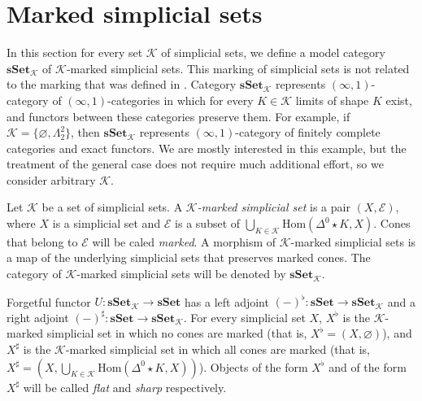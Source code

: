 \documentclass[reqno]{amsart}
\theoremstyle{definition}
\theoremstyle{remark}
\newcommand{\cat}[1]{\mathbf{#1}}
\newcommand{\sSet}{\cat{sSet}}
\newcommand{\lc}{lc}
\newcommand{\lcc}{lcc}
\newcommand{\mlc}{\mathrm{\lc}}
\newcommand{\mlcc}{\mathrm{\lcc}}
\newcommand{\K}{$\mathcal{K}$}
\newcommand{\csSet}{\sSet_\mathcal{K}}
\newcommand{\lcsSet}{\sSet^\mlc}
\newcommand{\lccsSet}{\sSet^\mlcc}
\newcommand{\join}{\star}
\newcommand{\Hom}{\mathrm{Hom}}
\numberwithin{figure}{section}
\begin{document}
\section{Marked simplicial sets}

In this section for every set $\mathcal{K}$ of simplicial sets, we define a model category $\csSet$ of \K-marked simplicial sets.
This marking of simplicial sets is not related to the marking that was defined in \cite{lurie-topos}.
Category $\csSet$ represents $(\infty,1)$-category of $(\infty,1)$-categories in which for every $K \in \mathcal{K}$ limits of shape $K$ exist, and functors between these categories preserve them.
For example, if $\mathcal{K} = \{ \varnothing, \Lambda^2_2 \}$, then $\csSet$ represents $(\infty,1)$-category of finitely complete categories and exact functors.
We are mostly interested in this example, but the treatment of the general case does not require much additional effort, so we consider arbitrary $\mathcal{K}$.

\begin{comment}
In this section we define model categories $\lcsSet$ and $\lccsSet$ of \lc- and \lcc-marked simplicial sets.
These model categories represent $(\infty,1)$-categories of locally caretesian (that is, finitely complete) and locally cartesian closed $(\infty,1)$-categories respectively.
Objects of $\lcsSet$ and $\lccsSet$ are simplicial sets in which certain simplices are marked.
To distinguish these marking from each other and from marking defined in \cite{lurie-topos}, we call such simplicial sets \lc-marked and \lcc-marked.
\end{comment}

\begin{defn}
Let $\mathcal{K}$ be a set of simplicial sets.
A \emph{\K-marked simplicial set} is a pair $(X,\mathcal{E})$, where $X$ is a simplicial set and $\mathcal{E}$ is a subset of $\bigcup_{K \in \mathcal{K}} \Hom(\Delta^0 \join K, X)$.
Cones that belong to $\mathcal{E}$ will be caled \emph{marked}.
A morphism of \K-marked simplicial sets is a map of the underlying simplicial sets that preserves marked cones.
The category of \K-marked simplicial sets will be denoted by $\csSet$.
\end{defn}

Forgetful functor $U : \csSet \to \sSet$ has a left adjoint $(-)^\flat : \sSet \to \csSet$ and a right adjoint $(-)^\sharp : \sSet \to \csSet$.
For every simplicial set $X$, $X^\flat$ is the \K-marked simplicial set in which no cones are marked (that is, $X^\flat = (X,\varnothing)$),
and $X^\sharp$ is the \K-marked simplicial set in which all cones are marked (that is, $X^\sharp = (X,\bigcup_{K \in \mathcal{K}} \Hom(\Delta^0 \join K, X))$).
Objects of the form $X^\flat$ and of the form $X^\sharp$ will be called \emph{flat} and \emph{sharp} respectively.
\end{document}
